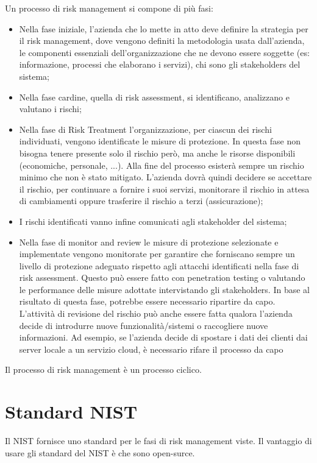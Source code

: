 \noindent Un processo di risk management si compone di più fasi:
\begin{itemize}
    \item Nella fase iniziale, l'azienda che lo mette in atto deve definire la strategia per il risk management, dove vengono definiti la metodologia usata dall'azienda, le componenti essenziali dell'organizzazione che ne devono essere soggette (es: informazione, processi che elaborano i servizi), chi sono gli stakeholders del sistema;
    \item Nella fase cardine, quella di risk assessment, si identificano, analizzano e valutano i rischi;
    \item Nella fase di Risk Treatment l'organizzazione, per ciascun dei rischi individuati, vengono identificate le misure di protezione. In questa fase non bisogna tenere presente solo il rischio però, ma anche le risorse disponibili (economiche, personale, ...). Alla fine del processo esisterà sempre un rischio minimo che non è stato mitigato. L'azienda dovrà quindi decidere se accettare il rischio, per continuare a fornire i suoi servizi, monitorare il rischio in attesa di cambiamenti oppure trasferire il rischio a terzi (assicurazione);
    \item I rischi identificati vanno infine comunicati agli stakeholder del sistema;
    \item Nella fase di monitor and review le misure di protezione selezionate e implementate vengono monitorate per garantire che forniscano sempre un livello di protezione adeguato rispetto agli attacchi identificati nella fase di risk assessment. Questo può essere fatto con penetration testing o valutando le performance delle misure adottate intervistando gli stakeholders. In base al risultato di questa fase, potrebbe essere necessario ripartire da capo. L'attività di revisione del rischio può anche essere fatta qualora l'azienda decide di introdurre nuove funzionalità/sistemi o raccogliere nuove informazioni. Ad esempio, se l'azienda decide di spostare i dati dei clienti dai server locale a un servizio cloud, è necessario rifare il processo da capo
\end{itemize}

\noindent Il processo di risk management è un processo ciclico.

\section{Standard NIST}

Il NIST fornisce uno standard per le fasi di risk management viste. Il vantaggio di usare gli standard del NIST è che sono open-surce.


